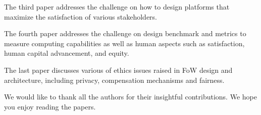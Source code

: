 \documentclass[11pt]{article}
\begin{document}
The third paper addresses the challenge on how to design platforms that maximize the satisfaction of various stakeholders.

The fourth paper addresses the challenge on design benchmark and metrics to measure computing capabilities as well as human aspects such as satisfaction, human capital advancement, and equity.

The last paper discusses various of ethics issues raised in FoW design and architecture, including privacy, compensation mechanisms and fairness.


We  would like to thank all the authors for their insightful contributions. We hope you enjoy reading the papers. 


\vspace{1em}
\end{document}
